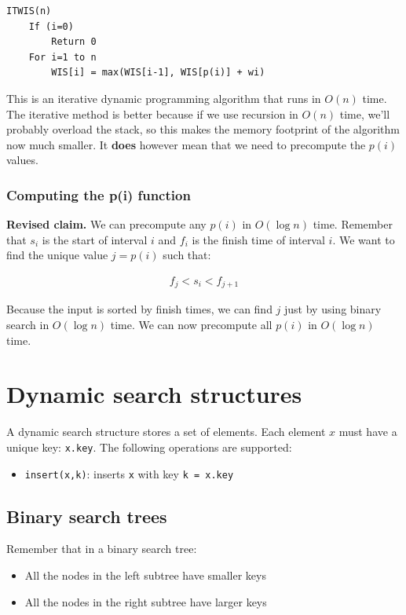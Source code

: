 \documentclass[11pt,a4paper,titlepage,dvipsnames,cmyk]{scrartcl}
\begin{document}
\begin{lstlisting}
ITWIS(n)
    If (i=0)
        Return 0
    For i=1 to n
        WIS[i] = max(WIS[i-1], WIS[p(i)] + wi)
\end{lstlisting}

This is an iterative dynamic programming algorithm that runs in $O(n)$
time. The iterative method is better because if we use recursion in $O(n)$
time, we'll probably overload the stack, so this makes the memory
footprint of the algorithm now much smaller. It \textbf{does} however mean
that we need to precompute the $p(i)$ values.

\subsubsection{Computing the p(i) function}%
\label{ssub:Computing the p(i) function}
\textbf{Revised claim.} We can precompute any $p(i)$ in $O(\log n)$ time.
Remember that $s_i$ is the start of interval $i$ and $f_i$ is the finish
time of interval $i$. We want to find the unique value $j = p(i)$ such
that:

\begin{align*}
    f_j < s_i < f_{j+1}
\end{align*}

Because the input is sorted by finish times, we can find $j$ just by using
binary search in $O(\log n)$ time. We can now precompute all $p(i)$ in
$O(\log n)$ time.

\section{Dynamic search structures}%
\label{sec:dynamic-search}
A dynamic search structure stores a set of elements. Each element $x$ must
have a unique key: \lstinline|x.key|. The following operations are
supported:

\begin{itemize}
    \item \lstinline|insert(x,k)|: inserts \lstinline|x|  with key \lstinline|k = x.key| 
\end{itemize}

\subsection{Binary search trees}%
\label{sub:bin-search-tree}
Remember that in a binary search tree:
\begin{itemize}
    \item All the nodes in the left subtree have smaller keys
    \item All the nodes in the right subtree have larger keys
\end{itemize}
\end{document}
